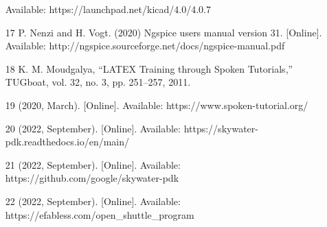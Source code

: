 \begin{enumerate}
Available: https://launchpad.net/kicad/4.0/4.0.7 
\item   [17]   P. Nenzi and H. Vogt. (2020) Ngspice users manual version 31. [Online]. \\
Available: http://ngspice.sourceforge.net/docs/ngspice-manual.pdf 
\item [18]   K. M. Moudgalya, “LATEX Training through Spoken Tutorials,” TUGboat, vol. 32, no. 3, pp. 251–257, 2011. 
\item [19]   (2020, March). [Online]. Available: https://www.spoken-tutorial.org/ 
\item [20]   (2022, September). [Online]. Available: https://skywater-pdk.readthedocs.io/en/main/
\item [21]   (2022, September). [Online]. Available: https://github.com/google/skywater-pdk
\item [22]   (2022, September). [Online]. Available: https://efabless.com/open\_shuttle\_program
\end{enumerate}
